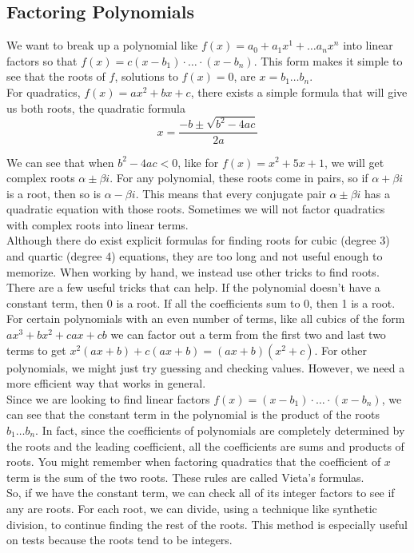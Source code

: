 \subsection{Factoring Polynomials}
\noindent
We want to break up a polynomial like $f(x) = a_0 + a_1x^1 + \ldots a_nx^n$ into linear factors so that $f(x) = c(x-b_1)\cdot \ldots \cdot(x - b_n)$. This form makes it simple to see that the roots of $f$, solutions to $f(x) = 0$, are $x = b_1 \ldots b_n$.\\

\noindent
For quadratics, $f(x) = ax^2 + bx + c$, there exists a simple formula that will give us both roots, the quadratic formula
\begin{equation*}
	x = \frac{-b \pm \sqrt{b^2-4ac}}{2a}
\end{equation*}

\noindent
We can see that when $b^2 - 4ac < 0$, like for $f(x) = x^2 + 5x + 1$, we will get complex roots $\alpha \pm \beta i$. For any polynomial, these roots come in pairs, so if $\alpha + \beta i$ is a root, then so is $\alpha - \beta i$. This means that every conjugate pair $\alpha \pm \beta i$ has a quadratic equation with those roots. Sometimes we will not factor quadratics with complex roots into linear terms.\\

\noindent
Although there do exist explicit formulas for finding roots for cubic (degree 3) and quartic (degree 4) equations, they are too long and not useful enough to memorize. When working by hand, we instead use other tricks to find roots.\\

\noindent
There are a few useful tricks that can help. If the polynomial doesn't have a constant term, then 0 is a root. If all the coefficients sum to 0, then 1 is a root. For certain polynomials with an even number of terms, like all cubics of the form $ax^3 + bx^2 + cax + cb$ we can factor out a term from the first two and last two terms to get $x^2(ax+b)+c(ax+b) = (ax+b)(x^2+c)$. For other polynomials, we might just try guessing and checking values. However, we need a more efficient way that works in general.\\

\noindent
Since we are looking to find linear factors $f(x) = (x-b_1)\cdot \ldots \cdot(x-b_n)$, we can see that the constant term in the polynomial is the product of the roots $b_1 \ldots b_n$. In fact, since the coefficients of polynomials are completely determined by the roots and the leading coefficient, all the coefficients are sums and products of roots. You might remember when factoring quadratics that the coefficient of $x$ term is the sum of the two roots. These rules are called Vieta's formulas.\\

\noindent
So, if we have the constant term, we can check all of its integer factors to see if any are roots. For each root, we can divide, using a technique like synthetic division, to continue finding the rest of the roots. This method is especially useful on tests because the roots tend to be integers.

\ifodd{}\fi